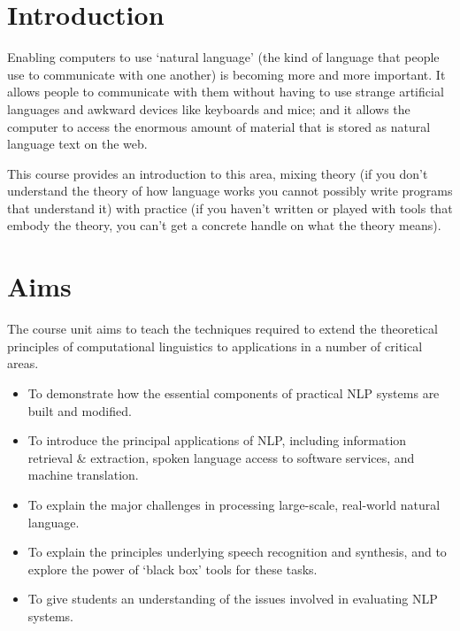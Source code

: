 \section*{Introduction}

Enabling computers to use `natural language' (the kind of language that people
use to communicate with one another) is becoming more and more important. It
allows people to communicate with them without having to use strange artificial
languages and awkward devices like keyboards and mice; and it allows the
computer to access the enormous amount of material that is stored as natural
language text on the web.

This course provides an introduction to this area, mixing theory (if you don't
understand the theory of how language works you cannot possibly write programs
that understand it) with practice (if you haven't written or played with tools
that embody the theory, you can't get a concrete handle on what the theory
means).

\section*{Aims}

The course unit aims to teach the techniques required to extend the theoretical
principles of computational linguistics to applications in a number of critical
areas.

\begin{itemize}
  \item To demonstrate how the essential components of practical NLP systems
  are built and modified.
  \item To introduce the principal applications of NLP, including information
  retrieval \& extraction, spoken language access to software services, and
  machine translation.
  \item To explain the major challenges in processing large-scale, real-world
  natural language.
  \item To explain the principles underlying speech recognition and synthesis,
  and to explore the power of `black box' tools for these tasks.
  \item To give students an understanding of the issues involved in evaluating
  NLP systems.
\end{itemize}

